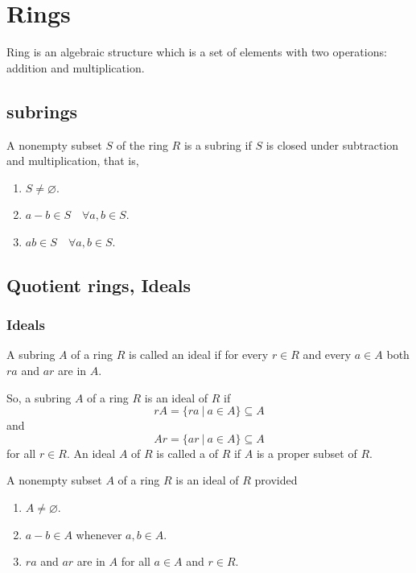 \chapter{Rings}

Ring is an algebraic structure which is a set of elements with two operations: addition and multiplication.

\section{subrings}

\begin{theorem}
    A nonempty subset $S$ of the ring $R$ is a subring if $S$ is closed under subtraction and multiplication, that is,
    \begin{enumerate}
        \item $S \neq \varnothing$.
        \item $a - b \in S \quad \forall a, b \in S$.
        \item $ab \in S \quad \forall a, b \in S$.
    \end{enumerate}
\end{theorem}

\section{Quotient rings, Ideals}

\subsection{Ideals}

\begin{definition}[Ideals]
    A subring $A$ of a ring $R$ is called an ideal if for every $r \in R$ and every $a \in A$ both $ra$ and 
    $ar$ are in $A$.
\end{definition}

So, a subring $A$ of a ring $R$ is an ideal of $R$ if 
\[
   rA = \{ ra \> | \> a \in A \} \subseteq A
\]
and 
\[
    Ar = \{ ar \> | \> a \in A \} \subseteq A
\]
for all $r \in R$. An ideal $A$ of $R$ is called a  of $R$ if $A$ is a proper subset of $R$.

\begin{theorem}
    A nonempty subset $A$ of a ring $R$ is an ideal of $R$ provided
    \begin{enumerate}
        \item $A \neq \varnothing$.
        \item $a - b \in A$ whenever $a, b \in A$.
        \item $ra$ and $ar$ are in $A$ for all $a \in A$ and $r \in R$.
    \end{enumerate}
\end{theorem}

